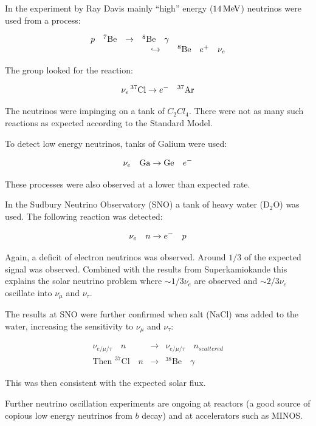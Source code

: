 In the experiment by Ray Davis mainly ``high'' energy ($14 \mathrm{\,MeV}$) neutrinos were used from a process:

\[
  \begin{array}{cccc}
  p \quad ^7\textrm{Be} & \to & ^8\textrm{Be} \quad \gamma & \\
               &     & \hookrightarrow   & ^8\textrm{Be} \quad e^+ \quad \nu_e
  \end{array}
\]

The group looked for the reaction:

\[
  \nu_e \, {}^{37}\textrm{Cl} \to e^- \quad \phantom{}^{37}\textrm{Ar}
\]

The neutrinos were impinging on a tank of $C_2Cl_4$.  There were not as many such reactions as expected according to the Standard Model.

To detect low energy neutrinos, tanks of Galium were used:

\[
  \nu_e \quad \textrm{Ga} \to \textrm{Ge} \quad e^-
\]

These processes were also observed at a lower than expected rate.

In the Sudbury Neutrino Observatory (SNO) a tank of heavy water ($\textrm{D}_2\textrm{O}$) was used.  The following reaction was detected:

\[
  \nu_e \quad n \to e^- \quad p
\]

Again, a deficit of electron neutrinos was observed.  Around $1/3$ of the expected signal was observed.  Combined with the results from Superkamiokande this explains the solar neutrino problem where $\sim 1/3 \nu_e$ are observed and $\sim 2/3 \nu_e$ oscillate into $\nu_{\mu}$ and $\nu_{\tau}$.

The results at SNO were further confirmed when salt ($\textrm{NaCl}$) was added to the water, increasing the sensitivity to $\nu_{\mu}$ and $\nu_{\tau}$:

\begin{eqnarray*}
  \nu_{e/\mu/\tau} \quad n       & \to & \nu_{e/\mu/\tau} \quad n_{scattered} \\
  \textrm{Then } ^{37}\textrm{Cl} \quad n & \to & ^{38}\textrm{Be} \quad \gamma
\end{eqnarray*}

This was then consistent with the expected solar flux.

Further neutrino oscillation experiments are ongoing at reactors (a good source of copious low energy neutrinos from $b$ decay) and at accelerators such as MINOS.

